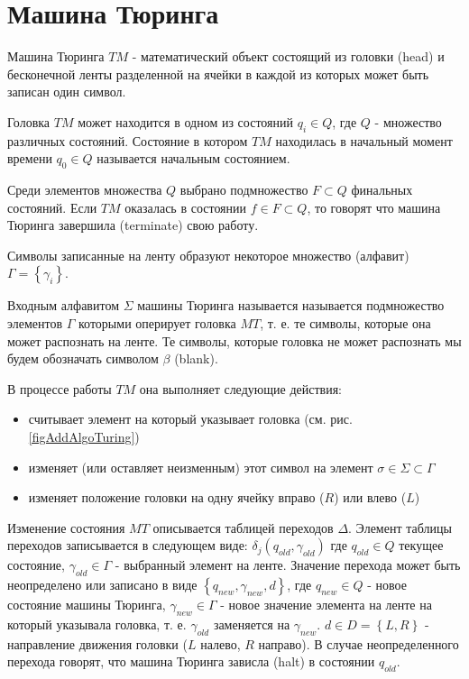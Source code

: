 \section{Машина Тюринга}
\label{addTuring}

Машина Тюринга $TM$ - математический объект состоящий из
головки (head) и бесконечной ленты разделенной на ячейки в каждой из
которых может быть записан один символ.



Головка $TM$ может находится в одном из состояний $q_i \in Q$, где $Q$
- множество различных состояний. Состояние в котором $TM$ находилась в
начальный момент времени $q_0 \in Q$ называется начальным состоянием. 

Среди элементов множества $Q$ выбрано подмножество $F \subset Q$
финальных состояний. Если $TM$ оказалась в состоянии $f \in F \subset
Q$, то говорят что машина Тюринга завершила (terminate) свою работу.

Символы записанные на ленту образуют некоторое множество (алфавит)
$\Gamma = \left\{\gamma_i\right\}$.

Входным алфавитом $\Sigma$ машины Тюринга называется называется
подмножество элементов $\Gamma$ которыми оперирует головка $MT$,
т. е. те символы, которые она может распознать на ленте. Те символы,
которые головка не может распознать мы будем обозначать символом
$\beta$ (blank).

В процессе работы $TM$ она выполняет следующие действия:
\begin{itemize}
\item{считывает элемент на который указывает головка
  (см. рис. \ref{figAddAlgoTuring})}
\item{изменяет (или оставляет неизменным) этот символ на элемент
  $\sigma \in \Sigma \subset \Gamma$}
\item{изменяет положение головки на одну ячейку вправо ($R$) или влево
($L$)}
\end{itemize}

Изменение состояния $MT$ описывается таблицей переходов
$\Delta$. Элемент таблицы переходов записывается в следующем виде: 
$\delta_j\left(q_{old}, \gamma_{old}\right)$ где $q_{old} \in Q$ текущее состояние,
$\gamma_{old} \in \Gamma$ - выбранный элемент на ленте. Значение
перехода может быть 
неопределено или записано в виде $\left\{q_{new}, \gamma_{new}, d\right\}$, где
$q_{new} \in Q$ - новое состояние машины Тюринга, $\gamma_{new} \in \Gamma$ -
новое значение элемента на ленте на который указывала головка,
т. е. $\gamma_{old}$ заменяется на $\gamma_{new}$. $d \in D =
\left\{L, R\right\}$ - направление
движения головки ($L$ налево, $R$ направо). В случае неопределенного
перехода говорят, что машина Тюринга зависла (halt) в 
состоянии $q_{old}$.



